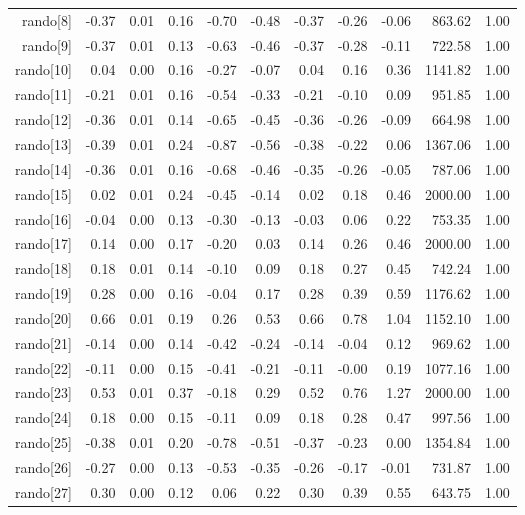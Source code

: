 \begin{table}[ht]
\begin{tabular}{rrrrrrrrrrr}
  rando[8] & -0.37 & 0.01 & 0.16 & -0.70 & -0.48 & -0.37 & -0.26 & -0.06 & 863.62 & 1.00 \\ 
  rando[9] & -0.37 & 0.01 & 0.13 & -0.63 & -0.46 & -0.37 & -0.28 & -0.11 & 722.58 & 1.00 \\ 
  rando[10] & 0.04 & 0.00 & 0.16 & -0.27 & -0.07 & 0.04 & 0.16 & 0.36 & 1141.82 & 1.00 \\ 
  rando[11] & -0.21 & 0.01 & 0.16 & -0.54 & -0.33 & -0.21 & -0.10 & 0.09 & 951.85 & 1.00 \\ 
  rando[12] & -0.36 & 0.01 & 0.14 & -0.65 & -0.45 & -0.36 & -0.26 & -0.09 & 664.98 & 1.00 \\ 
  rando[13] & -0.39 & 0.01 & 0.24 & -0.87 & -0.56 & -0.38 & -0.22 & 0.06 & 1367.06 & 1.00 \\ 
  rando[14] & -0.36 & 0.01 & 0.16 & -0.68 & -0.46 & -0.35 & -0.26 & -0.05 & 787.06 & 1.00 \\ 
  rando[15] & 0.02 & 0.01 & 0.24 & -0.45 & -0.14 & 0.02 & 0.18 & 0.46 & 2000.00 & 1.00 \\ 
  rando[16] & -0.04 & 0.00 & 0.13 & -0.30 & -0.13 & -0.03 & 0.06 & 0.22 & 753.35 & 1.00 \\ 
  rando[17] & 0.14 & 0.00 & 0.17 & -0.20 & 0.03 & 0.14 & 0.26 & 0.46 & 2000.00 & 1.00 \\ 
  rando[18] & 0.18 & 0.01 & 0.14 & -0.10 & 0.09 & 0.18 & 0.27 & 0.45 & 742.24 & 1.00 \\ 
  rando[19] & 0.28 & 0.00 & 0.16 & -0.04 & 0.17 & 0.28 & 0.39 & 0.59 & 1176.62 & 1.00 \\ 
  rando[20] & 0.66 & 0.01 & 0.19 & 0.26 & 0.53 & 0.66 & 0.78 & 1.04 & 1152.10 & 1.00 \\ 
  rando[21] & -0.14 & 0.00 & 0.14 & -0.42 & -0.24 & -0.14 & -0.04 & 0.12 & 969.62 & 1.00 \\ 
  rando[22] & -0.11 & 0.00 & 0.15 & -0.41 & -0.21 & -0.11 & -0.00 & 0.19 & 1077.16 & 1.00 \\ 
  rando[23] & 0.53 & 0.01 & 0.37 & -0.18 & 0.29 & 0.52 & 0.76 & 1.27 & 2000.00 & 1.00 \\ 
  rando[24] & 0.18 & 0.00 & 0.15 & -0.11 & 0.09 & 0.18 & 0.28 & 0.47 & 997.56 & 1.00 \\ 
  rando[25] & -0.38 & 0.01 & 0.20 & -0.78 & -0.51 & -0.37 & -0.23 & 0.00 & 1354.84 & 1.00 \\ 
  rando[26] & -0.27 & 0.00 & 0.13 & -0.53 & -0.35 & -0.26 & -0.17 & -0.01 & 731.87 & 1.00 \\ 
  rando[27] & 0.30 & 0.00 & 0.12 & 0.06 & 0.22 & 0.30 & 0.39 & 0.55 & 643.75 & 1.00 \\ 

\end{tabular}
\end{table}

